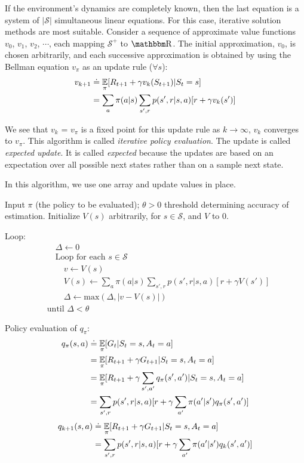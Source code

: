 \documentclass[sutton_barto_notes.tex]{subfiles}
\begin{document}
If the environment's dynamics are completely known, then the last equation is a system of $|\mathcal{S}|$ simultaneous linear equations.
For this case, iterative solution methods are most suitable. Consider a sequence of approximate value functions $v_0$, $v_1$, $v_2$, $\cdots$, each mapping $\mathcal{S^+}$ to $\R$.
The initial approximation, $v_0$, is chosen arbitrarily, and each successive approximation is obtained by using the Bellman equation $v_\pi$ as an update rule ($\forall s$):
\begin{align*}
v_{k+1} & \doteq \operatorname*{\mathbb{E}}_\pi [R_{t+1} + \gamma v_k (S_{t+1}) | S_t = s] \\
& = \sum_a \pi (a|s) \sum_{s',r} p(s',r|s,a)[r+\gamma v_k (s')]
\end{align*}

We see that $v_k$ = $v_\pi$ is a fixed point for this update rule as $k \rightarrow \infty$, $v_k$ converges to $v_\pi$. This algorithm is called \textit{iterative policy evaluation}.
The update is called \textit{expected update}. It is called \textit{expected} because the updates are based on an expectation over all possible next states rather than on a sample next state.

In this algorithm, we use one array and update values in place.
\begin{tcolorbox}[width=\textwidth,title={Iterative Policy Evaluation, for estimating $V \approx v_\pi$}]
Input $\pi$ (the policy to be evaluated); $\theta > 0$ threshold determining accuracy of estimation.
Initialize $V(s)$ arbitrarily, for $s \in \mathcal{S}$, and $V$ to 0.

Loop:
\begin{align*}
&\quad\Delta \leftarrow 0 \\
&\quad\text{Loop for each } s \in \mathcal{S} \\
&\quad\quad v \leftarrow V(s) \\
&\quad\quad V(s) \leftarrow \sum_a \pi (a|s) \sum_{s',r} p(s',r|s,a)[r + \gamma V(s')] \\
&\quad\quad \Delta \leftarrow \text{max}(\Delta, |v-V(s)|) \\
&\text{until } \Delta < \theta
\end{align*}
\end{tcolorbox}


Policy evaluation of $q_\pi$:
\begin{align*}
q_\pi(s,a) & \doteq \operatorname*{\mathbb{E}}_\pi [G_t | S_t = s, A_t = a] \\
& = \operatorname*{\mathbb{E}}_\pi [R_{t+1} + \gamma G_{t+1} | S_t = s, A_t = a] \\
& = \operatorname*{\mathbb{E}}_\pi [R_{t+1} + \gamma \sum_{s',a'} q_\pi (s',a') | S_t = s, A_t = a] \\
& = \sum_{s',r} p(s',r|s,a) [ r+ \gamma \sum_{a'} \pi(a'|s')q_\pi(s',a')]
\end{align*}
\begin{align*}
q_{k+1}(s,a) & \doteq \operatorname*{\mathbb{E}}_\pi [R_{t+1} + \gamma G_{t+1} | S_t = s, A_t = a] \\
& = \sum_{s',r} p(s',r|s,a)[r+\gamma \sum_{a'} \pi (a'|s')q_k(s',a')]
\end{align*}
\end{document}
